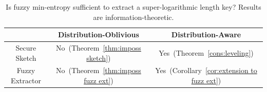 \documentclass[11pt]{article}
\newcommand{\thref}[1]{\mbox{Theorem~\ref{#1}}}
\newcommand{\corref}[1]{\mbox{Corollary~\ref{#1}}}
\newcommand{\Hfuzz}{\mathrm{H}^{\mathtt{fuzz}}_{t,\infty}}
\begin{document}
\begin{table}
\begin{center}
\begin{tabular}{c | c | c }
& Distribution-Oblivious & Distribution-Aware\\
\hline
Secure Sketch & No~(\thref{thm:imposs sketch}) & Yes~(\thref{cons:leveling})\\
\hline
Fuzzy Extractor & No~(\thref{thm:imposs fuzz ext}) & Yes~(\corref{cor:extension to fuzz ext})
\end{tabular}
\end{center}
\caption{Is fuzzy min-entropy sufficient to extract a super-logarithmic length key?  Results are information-theoretic.}
\label{tab:main results}
\end{table}




\end{document}
